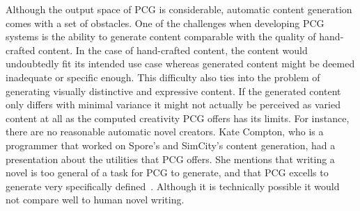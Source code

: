 Although the output space of PCG is considerable, automatic content generation comes with a set of obstacles.
One of the challenges when developing PCG systems is the ability to generate content comparable with the quality of hand-crafted content.
In the case of hand-crafted content, the content would undoubtedly fit its intended use case whereas generated content might be deemed inadequate or specific enough.
This difficulty also ties into the problem of generating visually distinctive and expressive content.
If the generated content only differs with minimal variance it might not actually be perceived as varied content at all as
the computed creativity PCG offers has its limits. For instance, there are no reasonable automatic novel creators. Kate Compton, who is a programmer that worked on Spore's and SimCity's content generation, had a presentation about the utilities that PCG offers. She mentions that writing a novel is too general of a task for PCG to generate, and that PCG excells to generate very specifically defined~\cite{PCG_for_everyone}. Although it is technically possible it would not compare well to human novel writing.







